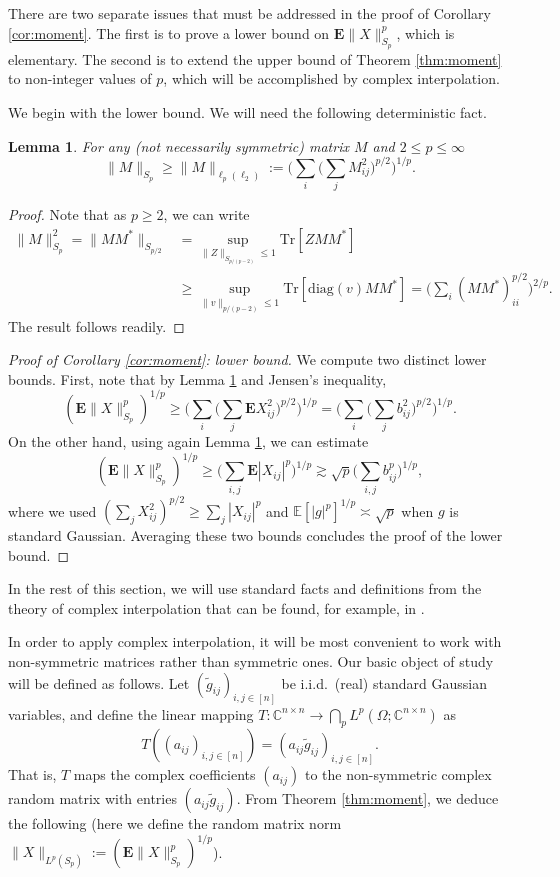 \documentclass[10pt,reqno]{amsart}
\newtheorem{lem}[thm]{Lemma}
\theoremstyle{definition}
\numberwithin{equation}{section}
\numberwithin{figure}{section}
\numberwithin{table}{section}
\begin{document}
There are two separate issues that must be addressed in the proof of 
Corollary \ref{cor:moment}. The first is to prove a lower bound on 
$\mathbf{E}\|X\|_{S_p}^p$, which is elementary. The second is to extend 
the upper bound of Theorem \ref{thm:moment} to non-integer values of $p$,
which will be accomplished by complex interpolation.

We begin with the lower bound. We will need the following 
deterministic fact.

\begin{lem}
\label{lem:schlp}
For any (not necessarily symmetric) matrix $M$ and
$2\le p\le\infty$
$$
	\|M\|_{S_p} \ge
	\|M\|_{\ell_p(\ell_2)} :=
	\Bigg(\sum_i\Bigg(\sum_j M_{ij}^2\Bigg)^{p/2}\Bigg)^{1/p}.
$$
\end{lem}

\begin{proof}
Note that as $p\ge 2$, we can write
\begin{align*}
	\|M\|_{S_p}^2 =
	\|MM^*\|_{S_{p/2}} &=
	\sup_{\|Z\|_{S_{p/(p-2)}}\le 1} \mathrm{Tr}[ZMM^*]
	\\ &\ge \sup_{\|v\|_{p/(p-2)}\le 1} 
	\mathrm{Tr}[\mathrm{diag}(v)MM^*] = 
	\Bigg(\sum_i (MM^*)_{ii}^{p/2}\Bigg)^{2/p}.
\end{align*}
The result follows readily.
\end{proof}

\begin{proof}[Proof of Corollary \ref{cor:moment}: lower bound]
We compute two distinct lower bounds. First, note that by Lemma 
\ref{lem:schlp} and Jensen's inequality,
$$
	(\mathbf{E}\|X\|_{S_p}^p)^{1/p} \ge
	\Bigg(\sum_i\Bigg(\sum_j 
	\mathbf{E}X_{ij}^2\Bigg)^{p/2}\Bigg)^{1/p} =
	\Bigg(\sum_i\Bigg(\sum_j 
	b_{ij}^2\Bigg)^{p/2}\Bigg)^{1/p}.
$$
On the other hand, using again Lemma \ref{lem:schlp}, we can estimate
$$
	(\mathbf{E}\|X\|_{S_p}^p)^{1/p} \ge
	\Bigg(\sum_{i,j}\mathbf{E}|X_{ij}|^p\Bigg)^{1/p}
	\gtrsim \sqrt{p}\Bigg(\sum_{i,j}b_{ij}^p\Bigg)^{1/p},
$$
where we used $(\sum_j X_{ij}^2)^{p/2} \ge \sum_j |X_{ij}|^p$ and
$\mathbb{E}[|g|^p]^{1/p} \asymp \sqrt{p}$ when $g$ is standard Gaussian.
Averaging these two bounds concludes the proof of the lower bound.
\end{proof}

In the rest of this section, we will use standard facts and definitions 
from the theory of complex interpolation that can be found, for example, 
in \cite[Chapter 8]{Pis16}.

In order to apply complex interpolation, it will be most convenient to 
work with non-symmetric matrices rather than symmetric ones. Our basic 
object of study will be defined as follows. Let $(\tilde 
g_{ij})_{i,j\in[n]}$ be i.i.d.\ (real) standard Gaussian variables, and 
define the linear mapping $T:\mathbb{C}^{n\times n}\to 
\bigcap_p L^p(\Omega;\mathbb{C}^{n\times n})$ as
$$
	T((a_{ij})_{i,j\in[n]}) = (a_{ij}\tilde g_{ij})_{i,j\in [n]}.
$$
That is, $T$ maps the complex coefficients $(a_{ij})$ to the non-symmetric 
complex random matrix with entries $(a_{ij}\tilde g_{ij})$.
From Theorem \ref{thm:moment}, we deduce the following (here we define the 
random matrix norm
$\|X\|_{L^{p}(S_{p})} := (\mathbf{E}\|X\|_{S_{p}}^{p})^{1/p}$).
\end{document}
